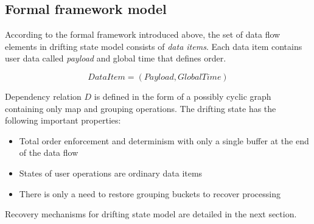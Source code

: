 \subsection{Formal framework model}

According to the formal framework introduced above, the set of data flow elements in drifting state model consists of {\em data items}. Each data item contains user data called {\em payload} and global time that defines order.

$$DataItem=(Payload,GlobalTime)$$

Dependency relation $D$ is defined in the form of a possibly cyclic graph containing only map and grouping operations. The drifting state has the following important properties:

\begin{itemize}
    \item Total order enforcement and determinism with only a single buffer at the end of the data flow
    \item States of user operations are ordinary data items
    \item There is only a need to restore grouping buckets to recover processing 
\end{itemize}

Recovery mechanisms for drifting state model are detailed in the next section.
